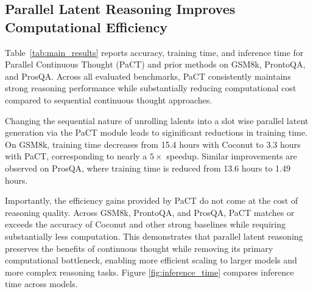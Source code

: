 
\subsection{Parallel Latent Reasoning Improves Computational Efficiency}
\label{sec:efficiency}

Table~\ref{tab:main_results} reports accuracy, training time, and inference time for Parallel Continuous Thought (PaCT) and prior methods on GSM8k, ProntoQA, and ProsQA. Across all evaluated benchmarks, PaCT consistently maintains strong reasoning performance while substantially reducing computational cost compared to sequential continuous thought approaches.

Changing the sequential nature of unrolling lalents into a slot wise parallel latent generation via the PaCT module leads to siginificant reductions in training time. On GSM8k, training time decreases from 15.4 hours with Coconut to 3.3 hours with PaCT, corresponding to nearly a $5\times$ speedup. Similar improvements are observed on ProsQA, where training time is reduced from 13.6 hours to 1.49 hours. 



Importantly, the efficiency gains provided by PaCT do not come at the cost of reasoning quality. Across GSM8k, ProntoQA, and ProsQA, PaCT matches or exceeds the accuracy of Coconut and other strong baselines while requiring substantially less computation. This demonstrates that parallel latent reasoning preserves the benefits of continuous thought while removing its primary computational bottleneck, enabling more efficient scaling to larger models and more complex reasoning tasks. Figure \ref{fig:inference_time} compares inference time across models.


